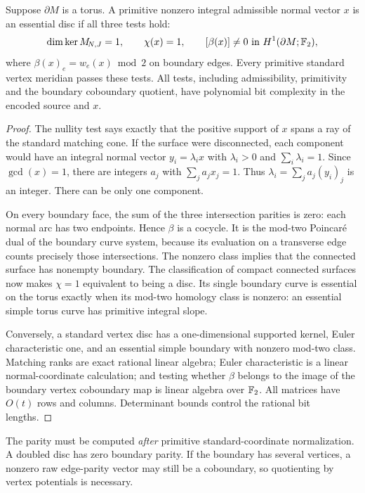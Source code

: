 \begin{proposition}
\label{prop:vertex-gate}
Suppose $\partial M$ is a torus. A primitive nonzero integral admissible
normal vector $x$ is an essential disc if all three tests hold:
\[
 \dim\ker M_{\!N,J}=1,\qquad \chi(x)=1,\qquad
 [\beta(x)]\ne0\ \text{in }H^1(\partial M;\mathbb F_2),
\]
where $\beta(x)_e=w_e(x)\bmod2$ on boundary edges. Every primitive
standard vertex meridian passes these tests. All tests, including
admissibility, primitivity and the boundary coboundary quotient, have
polynomial bit complexity in the encoded source and $x$.
\end{proposition}
\begin{proof}
The nullity test says exactly that the positive support of $x$ spans a
ray of the standard matching cone. If the surface were disconnected,
each component would have an integral normal vector $y_i=\lambda_i x$
with $\lambda_i>0$ and $\sum_i\lambda_i=1$. Since $\gcd(x)=1$, there
are integers $a_j$ with $\sum_j a_jx_j=1$. Thus
$\lambda_i=\sum_j a_j(y_i)_j$ is an integer. There can be only one
component.

On every boundary face, the sum of the three intersection parities is
zero: each normal arc has two endpoints. Hence $\beta$ is a cocycle.
It is the mod-two Poincar\'e dual of the boundary curve system, because
its evaluation on a transverse edge counts precisely those intersections.
The nonzero class implies that the connected surface has nonempty
boundary. The classification of compact connected surfaces now makes
$\chi=1$ equivalent to being a disc. Its single boundary curve is
essential on the torus exactly when its mod-two homology class is
nonzero: an essential simple torus curve has primitive integral slope.

Conversely, a standard vertex disc has a one-dimensional supported
kernel, Euler characteristic one, and an essential simple boundary with
nonzero mod-two class. Matching ranks are exact rational linear algebra;
Euler characteristic is a linear normal-coordinate calculation; and
testing whether $\beta$ belongs to the image of the boundary vertex
coboundary map is linear algebra over $\mathbb F_2$. All matrices have $O(t)$
rows and columns. Determinant bounds control the rational bit lengths.
\end{proof}

The parity must be computed \emph{after} primitive standard-coordinate
normalization. A doubled disc has zero boundary parity. If the boundary
has several vertices, a nonzero raw edge-parity vector may still be a
coboundary, so quotienting by vertex potentials is necessary.

